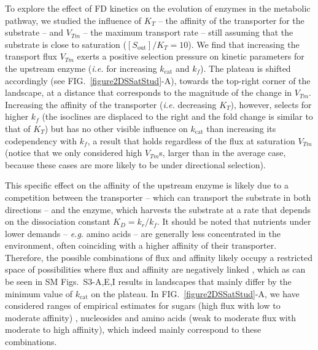 To explore the effect of FD kinetics on the evolution of enzymes in the metabolic pathway, we studied the influence of  $K_T$ -- the affinity of the transporter for the substrate -- and $V_{Tm}$ -- the maximum transport rate -- still assuming that the substrate is close to saturation ($[S_\text{out}]/K_T=10$). We find that increasing the transport flux $V_{Tm}$ exerts a positive selection pressure on kinetic parameters for the upstream enzyme (\textit{i.e.} for increasing $k_\text{cat}$ and $k_f$). The plateau is shifted accordingly (see FIG.~\ref{figure2DSSatStud}-A), towards the top-right corner of the landscape, at a distance that corresponds to the magnitude of the change in $V_{Tm}$. Increasing the affinity of the transporter (\textit{i.e.} decreasing $K_T$), however, selects for higher $k_{f}$ (the isoclines are displaced to the right and the fold change is similar to that of $K_T$) but has no other visible influence on $k_\text{cat}$ than increasing its codependency with $k_f$, a result that holds regardless of the flux at saturation $V_{Tm}$ (notice that we only considered high $V_{Tm}$s, larger than in the average case, because these cases are more likely to be under directional selection). 

This specific effect on the affinity of the upstream enzyme is likely due to a competition between the transporter -- which can transport the substrate in both directions -- and the enzyme, which harvests the substrate at a rate that depends on the dissociation constant $K_D=k_r/k_f$. It should be noted that nutrients under lower demands -- \textit{e.g.} amino acids -- are generally less concentrated in the environment, often coinciding with a higher affinity of their transporter. Therefore, the possible combinations of flux and affinity likely occupy a restricted space of possibilities where flux and affinity are negatively linked \citep{Gudelj10,Bosdriesz18}, which as can be seen in SM Figs.~S3-A,E,I results in landscapes that mainly differ by the minimum value of $k_\text{cat}$ on the plateau. In FIG.~\ref{figure2DSSatStud}-A, we have considered ranges of empirical estimates for sugars (high flux with low to moderate affinity) \citep{Stein86d,Maier02}, nucleosides \citep{Griffith96} and amino acids \citep{Stein86d,Zampieri2019} (weak to moderate flux with moderate to high affinity), which indeed mainly correspond to these combinations.   


